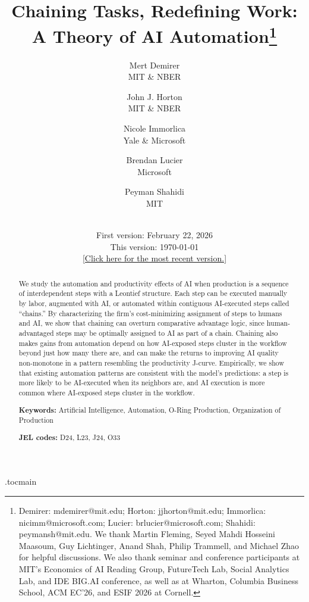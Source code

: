 \documentclass[12pt, final]{article}
\title{Chaining Tasks, Redefining Work:\\ A Theory of AI Automation\thanks{Demirer: \mbox{mdemirer@mit.edu}; Horton: \mbox{jjhorton@mit.edu}; Immorlica: \mbox{nicimm@microsoft.com}; Lucier: \mbox{brlucier@microsoft.com}; Shahidi: \mbox{peymansh@mit.edu}. We thank Martin Fleming, Seyed Mahdi Hosseini Maasoum, Guy Lichtinger, Anand Shah, Philip Trammell, and Michael Zhao for helpful discussions. We also thank seminar and conference participants at MIT's Economics of AI Reading Group, FutureTech Lab, Social Analytics Lab, and IDE BIG.AI conference, as well as at Wharton, Columbia Business School, ACM EC'26, and ESIF 2026 at Cornell.}}
\author{Mert Demirer \\ MIT \& NBER \and John J. Horton \\ MIT \& NBER \and Nicole Immorlica \\ Yale \& Microsoft \and Brendan Lucier \\ Microsoft \and Peyman Shahidi \\ MIT}
\date{\mbox{} \\
First version: February 22, 2026 \\
This version: \today \\
\href{https://peymanshahidi.github.io/assets/pdf/chaining_tasks_ai_automation.pdf}{[Click here for the most recent version.]}}
\begin{document}
 \etocdepthtag.toc{main}

\cftsetpnumwidth{3.9em}
\cftsetrmarg{4.9em}

\ifoptionfinal
{}%
{
{
\small
\thispagestyle{empty}
\tableofcontents
\newpage
\listoffigures
\newpage
\listoftables
\newpage
}
}

\thispagestyle{empty}

\maketitle


\begin{abstract}
\noindent
We study the automation and productivity effects of AI when production is a sequence of interdependent steps with a Leontief structure.
Each step can be executed manually by labor, augmented with AI, or automated within contiguous AI-executed steps called ``chains.''
By characterizing the firm's cost-minimizing assignment of steps to humans and AI, we show that chaining can overturn comparative advantage logic, since human-advantaged steps may be optimally assigned to AI as part of a chain.
Chaining also makes gains from automation depend on how AI-exposed steps cluster in the workflow beyond just how many there are, and can make the returns to improving AI quality non-monotone in a pattern resembling the productivity J-curve.
Empirically, we show that existing automation patterns are consistent with the model's predictions: a step is more likely to be AI-executed when its neighbors are, and AI execution is more common where AI-exposed steps cluster in the workflow.

\vspace{0.5cm}
\noindent \textbf{Keywords:} Artificial Intelligence, Automation, O-Ring Production, Organization of Production

\noindent \textbf{JEL codes:} D24, L23, J24, O33

\end{abstract}
\vspace{1ex}
\end{document}
